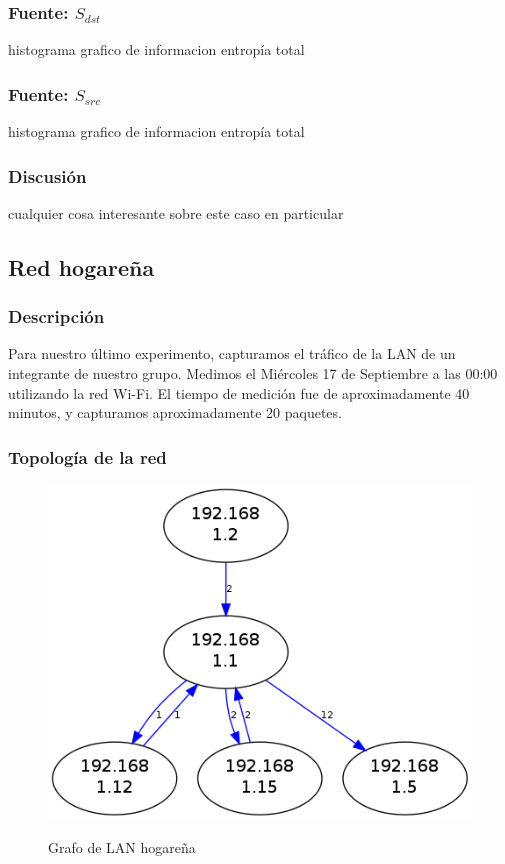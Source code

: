\documentclass[10pt, a4paper]{article}
\begin{document}
\subsubsection{Fuente: $S_{dst}$}

histograma
grafico de informacion
entropía total

\subsubsection{Fuente: $S_{src}$}

histograma
grafico de informacion
entropía total

\subsubsection{Discusión}

cualquier cosa interesante sobre este caso en particular

\subsection{Red hogareña}

\subsubsection{Descripción}
Para nuestro último experimento, capturamos el tráfico de la LAN de un integrante de nuestro grupo. Medimos el Miércoles 17 de Septiembre a las 00:00 utilizando la red Wi-Fi. El tiempo de medición fue de aproximadamente 40 minutos, y capturamos aproximadamente 20 paquetes.

\subsubsection{Topología de la red}

\begin{figure}[H]
  \begin{center}
    \includegraphics[width=\linewidth/2]{../imgs/pruebaFede-ips_red.png}
    \label{fig:FedeGrafo}
    \caption{Grafo de LAN hogareña}
  \end{center}
\end{figure}
\end{document}
